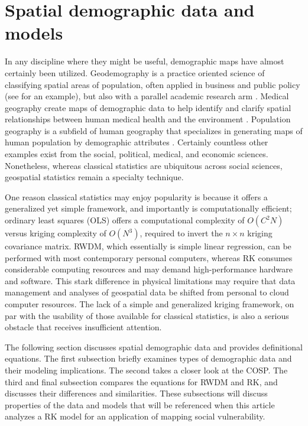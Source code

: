 \documentclass[]{interact}
\theoremstyle{plain}%
\theoremstyle{definition}
\theoremstyle{remark}
\begin{document}
\section{Spatial demographic data and models}

In any discipline where they might be useful, demographic maps have almost certainly been utilized.  Geodemography is a practice oriented science of classifying spatial areas of population, often applied in business and public policy (see \citep{acorn} for an example), but also with a parallel academic research arm \citep{oacug, pwnation, singleton14}.  Medical geography create maps of demographic data to help identify and clarify spatial relationships between human medical health and the environment \citep{brown09}.  Population geography is a subfield of human geography that specializes in generating maps of human population by demographic attributes \citep{bailey05}.  Certainly countless other examples exist from the social, political, medical, and economic sciences.  Nonetheless, whereas classical statistics are ubiquitous across social sciences, geospatial statistics remain a specialty technique.

One reason classical statistics may enjoy popularity is because it offers a generalized yet simple framework, and importantly is computationally efficient; ordinary least squares (OLS) offers a computational complexity of $O(C^2N)$ versus kriging complexity of $O(N^3)$, required to invert the $n \times n$ kriging covariance matrix.  RWDM, which essentially is simple linear regression, can be performed with most contemporary personal computers, whereas RK consumes considerable computing resources and may demand high-performance hardware and software.  This stark difference in physical limitations may require that data management and analyses of geospatial data be shifted from personal to cloud computer resources.  The lack of a simple and generalized kriging framework, on par with the usability of those available for classical statistics, is also a serious obstacle that receives insufficient attention.

The following section discusses spatial demographic data and provides definitional equations.  The first subsection briefly examines types of demographic data and their modeling implications.  The second takes a closer look at the COSP.  The third and final subsection compares the equations for RWDM and RK, and discusses their differences and similarities.  These subsections will discuss properties of the data and models that will be referenced when this article analyzes a RK model for an application of mapping social vulnerability.
\end{document}
